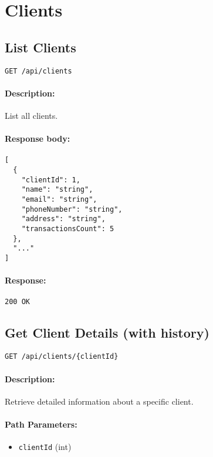 \documentclass[a4paper,11pt]{article}
\begin{document}
\section{Clients}
\label{sec:clients}

\subsection{List Clients}
\label{sec:clients-all}
\begin{verbatim}
GET /api/clients
\end{verbatim}
\paragraph{Description:} List all clients.
\paragraph{Response body:}
\begin{verbatim}
[
  {
    "clientId": 1,
    "name": "string",
    "email": "string",
    "phoneNumber": "string",
    "address": "string",
    "transactionsCount": 5
  },
  "..."
]
\end{verbatim}
\paragraph{Response:} \texttt{200 OK}

\subsection{Get Client Details (with history)}
\label{sec:clients-details}
\begin{verbatim}
GET /api/clients/{clientId}
\end{verbatim}
\paragraph{Description:} Retrieve detailed information about a specific client.
\paragraph{Path Parameters:}
\begin{itemize}
  \item \texttt{clientId} (int)
\end{itemize}
\end{document}

